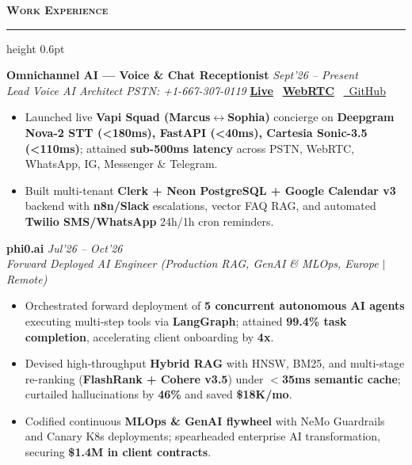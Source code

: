 \documentclass[10pt,a4paper]{article}
\newcommand{\resumesection}[1]{%
    \vspace{2.2pt}%
    {\color{burgundy}\scshape\bfseries\fontsize{9.0pt}{10.2pt}\selectfont #1}%
    \vspace{0.6pt}%
    \hrule height 0.6pt\relax%
    \vspace{1.6pt}%
}
\begin{document}
\noindent
\begin{minipage}[t]{0.488\textwidth}

    \resumesection{Work Experience}
    
    \noindent\textbf{Omnichannel AI --- Voice \& Chat Receptionist} \hfill {\footnotesize\textit{Sept'26 -- Present}}\\
    \textit{Lead Voice AI Architect \;\textbar\; PSTN: +1-667-307-0119} \; \href{https://ai-voice-receptionist.kishor.tech/}{\textbf{Live}} \textbar\ \href{https://ai-voice-receptionist.kishor.tech/vapi-call}{\textbf{WebRTC}} \textbar\ \href{https://github.com/KishorKumarParoi/omnichannel-voice-chat-ai-receptionist}{\faGithub\ GitHub}
    \begin{itemize}
        \item Launched live \textbf{Vapi Squad (Marcus$\leftrightarrow$Sophia)} concierge on \textbf{Deepgram Nova-2 STT (<180ms), FastAPI (<40ms), Cartesia Sonic-3.5 (<110ms)}; attained \textbf{sub-500ms latency} across PSTN, WebRTC, WhatsApp, IG, Messenger \& Telegram.
        \item Built multi-tenant \textbf{Clerk + Neon PostgreSQL + Google Calendar v3} backend with \textbf{n8n/Slack} escalations, vector FAQ RAG, and automated \textbf{Twilio SMS/WhatsApp} 24h/1h cron reminders.
    \end{itemize}

    \noindent\textbf{phi0.ai} \hfill {\footnotesize\textit{Jul'26 -- Oct'26}}\\
    \textit{Forward Deployed AI Engineer (Production RAG, GenAI \& MLOps, Europe $\vert$ Remote)}
    \begin{itemize}
        \item Orchestrated forward deployment of \textbf{5 concurrent autonomous AI agents} executing multi-step tools via \textbf{LangGraph}; attained \textbf{99.4\% task completion}, accelerating client onboarding by \textbf{4x}.
        \item Devised high-throughput \textbf{Hybrid RAG} with HNSW, BM25, and multi-stage re-ranking (\textbf{FlashRank + Cohere v3.5}) under \textbf{$<$35ms semantic cache}; curtailed hallucinations by \textbf{46\%} and saved \textbf{\$18K/mo}.
        \item Codified continuous \textbf{MLOps \& GenAI flywheel} with NeMo Guardrails and Canary K8s deployments; spearheaded enterprise AI transformation, securing \textbf{\$1.4M in client contracts}.
    \end{itemize}


\end{minipage}
\end{document}
